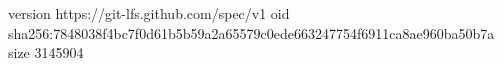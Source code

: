 version https://git-lfs.github.com/spec/v1
oid sha256:7848038f4bc7f0d61b5b59a2a65579c0ede663247754f6911ca8ae960ba50b7a
size 3145904
